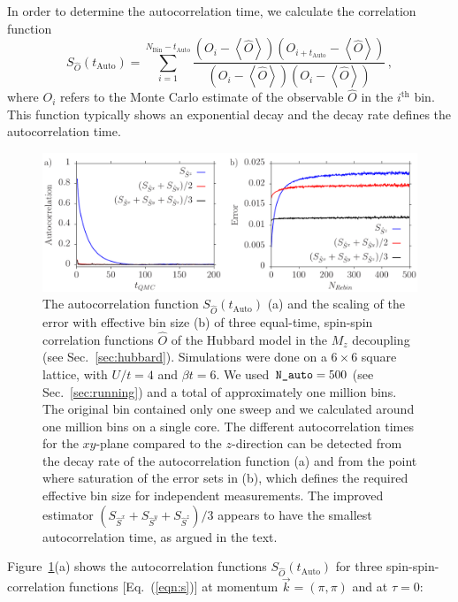In order to determine the autocorrelation time, we calculate the correlation function
\begin{equation}
\label{eqn:autocorrel}
	S_{\hat{O}}(t_{\textrm{Auto}})=\sum_{i=1}^{N_{\textrm{Bin}}-t_{\textrm{Auto}}}\frac{\left(O_i-\left\langle \hat{O}\right\rangle \right)\left(O_{i+t_{\textrm{Auto}}}-\left\langle \hat{O}\right\rangle \right)}{\left(O_i-\left\langle \hat{O}\right\rangle \right)\left(O_{i}-\left\langle \hat{O}\right\rangle \right)}\, ,
\end{equation}
where $O_i$ refers to the Monte Carlo estimate of the observable $\hat{O}$ in the $i^{\text{th}}$ bin. This function typically shows an exponential decay and the decay rate defines the autocorrelation time.
%
\begin{figure}
	\begin{center}
		\includegraphics[width=.95\textwidth]{fig1.pdf}
		\caption{The autocorrelation function $S_{\hat{O}}(t_{\textrm{Auto}})$ (a) and the scaling of the error with effective bin size (b) of three equal-time, spin-spin correlation functions $\hat{O}$ of the Hubbard model in the $M_z$ decoupling (see Sec.~\ref{sec:hubbard}). Simulations were done on a $ 6 \times 6$ square lattice, with  $U/t=4$ and $\beta t = 6$. We used $\textrm{\texttt{N\_auto}}=500$ (see Sec.~\ref{sec:running}) and a total of approximately one million bins. The original bin contained only one sweep and we calculated around one million bins on a single core. The different  autocorrelation times for the $xy$-plane compared to the $z$-direction can be detected from the decay rate of the autocorrelation function (a) and from the point where saturation of the error sets in (b), which defines the required effective bin size for independent measurements. The improved estimator $(S_{\hat{S}^{x}} + S_{\hat{S}^{y}}+ S_{\hat{S}^{z}})/3$ appears to have the smallest autocorrelation time, as argued in the text.}
		\label{fig_autocorr}
	\end{center}
\end{figure}
%
Figure~\ref{fig_autocorr}(a) shows the autocorrelation functions $S_{\hat{O}}(t_{\textrm{Auto}})$ for three spin-spin-correlation functions [Eq.~(\ref{eqn:s})] at momentum $\vec{k}=(\pi,\pi)$ and at $\tau=0$: 

